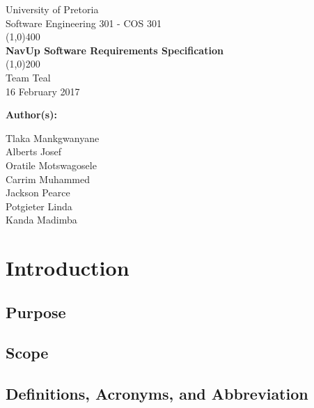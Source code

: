 \documentclass[12pt, a4paper]{article}
\begin{document}
\begin{titlepage}
	\begin{center}
	\huge{University of Pretoria\\
	Software Engineering 301 - COS 301}\\
	\line(1,0){400}\\
	\huge{\bfseries NavUp Software Requirements Specification}\\
	\line(1,0){200}\\
	Team Teal\\
	16 February 2017\\
	[3cm]
	\end{center}
	\begin{flushleft}
	\bfseries{Author(s):}
	\end{flushleft}
	\begin{flushleft}
	Tlaka Mankgwanyane	\\
	Alberts Josef			\\
	Oratile Motswagosele	\\
	Carrim Muhammed		\\
	Jackson Pearce			\\
	Potgieter Linda		\\
	Kanda Madimba			\\
	\end{flushleft}
\end{titlepage}

\section{Introduction}
	\subsection{Purpose}
	\subsection{Scope}
	\subsection{Definitions, Acronyms, and Abbreviation}
\end{document}
